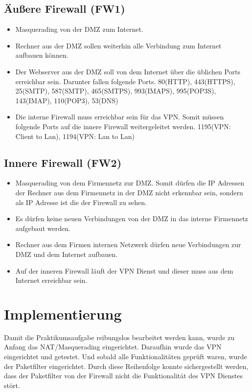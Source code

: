 \subsection{Äußere Firewall (FW1)}
\begin{itemize}
\item Masquerading von der DMZ zum Internet.
\item Rechner aus der DMZ sollen weiterhin alle Verbindung zum Internet aufbauen können.
\item Der Webserver aus der DMZ soll von dem Internet über die üblichen Ports erreichbar sein. Darunter fallen folgende Ports. 80(HTTP), 443(HTTPS), 25(SMTP), 587(SMTP), 465(SMTPS), 993(IMAPS), 995(POP3S), 143(IMAP), 110(POP3), 53(DNS)
\item Die interne Firewall muss erreichbar sein für das VPN. Somit müssen folgende Ports auf die innere Firewall weitergeleitet werden. 1195(VPN: Client to Lan), 1194(VPN: Lan to Lan)
\end{itemize}

\subsection{Innere Firewall (FW2)}
\begin{itemize}
\item Masquerading von dem Firmennetz zur DMZ. Somit dürfen die IP Adressen der Rechner aus dem Firmennetz in der DMZ nicht erkennbar sein, sondern als IP Adresse ist die der Firewall zu sehen.
\item Es dürfen keine neuen Verbindungen von der DMZ in das interne Firmennetz aufgebaut werden.
\item Rechner aus dem Firmen internen Netzwerk dürfen neue Verbindungen zur DMZ und dem Internet aufbauen.
\item Auf der inneren Firewall läuft der VPN Dienst und dieser muss aus dem Internet erreichbar sein.	
\end{itemize}

\section{Implementierung}
Damit die Praktikumsaufgabe reibungslos bearbeitet werden kann, wurde zu Anfang das NAT/Masquerading eingerichtet. Daraufhin wurde das VPN eingerichtet und getestet. Und sobald alle Funktionalitäten geprüft waren, wurde der Paketfilter eingerichtet. Durch diese Reihenfolge konnte sichergestellt werden, dass der Paketfilter von der Firewall nicht die Funktionalität des VPN Dienstes stört.


